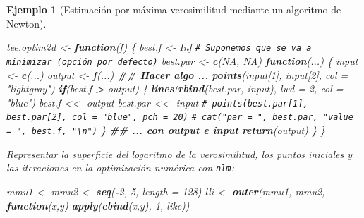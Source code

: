 \documentclass[
  spanish,
  10pt,
]{book}
\newenvironment{Shaded}{\begin{snugshade}}{\end{snugshade}}
\newcommand{\AttributeTok}[1]{\textcolor[rgb]{0.13,0.29,0.53}{#1}}
\newcommand{\CommentTok}[1]{\textcolor[rgb]{0.56,0.35,0.01}{\textit{#1}}}
\newcommand{\ConstantTok}[1]{\textcolor[rgb]{0.56,0.35,0.01}{#1}}
\newcommand{\ControlFlowTok}[1]{\textcolor[rgb]{0.13,0.29,0.53}{\textbf{#1}}}
\newcommand{\DecValTok}[1]{\textcolor[rgb]{0.00,0.00,0.81}{#1}}
\newcommand{\DocumentationTok}[1]{\textcolor[rgb]{0.56,0.35,0.01}{\textbf{\textit{#1}}}}
\newcommand{\FunctionTok}[1]{\textcolor[rgb]{0.13,0.29,0.53}{\textbf{#1}}}
\newcommand{\NormalTok}[1]{#1}
\newcommand{\OtherTok}[1]{\textcolor[rgb]{0.56,0.35,0.01}{#1}}
\newcommand{\SpecialCharTok}[1]{\textcolor[rgb]{0.81,0.36,0.00}{\textbf{#1}}}
\newcommand{\StringTok}[1]{\textcolor[rgb]{0.31,0.60,0.02}{#1}}
\theoremstyle{break}
\newtheorem{example}{Ejemplo}[chapter]
\theoremstyle{nonumberplain}
\renewcommand{\CommentTok}[1]{\textcolor[rgb]{0.41,0.41,0.41}{\texttt{#1}}}
\begin{document}
\begin{example}[Estimación por máxima verosimilitud mediante un algoritmo de Newton]
\begin{Shaded}
\begin{Highlighting}[]
\NormalTok{tee.optim2d }\OtherTok{\textless{}{-}} \ControlFlowTok{function}\NormalTok{(f) \{}
\NormalTok{  best.f }\OtherTok{\textless{}{-}} \ConstantTok{Inf}   \CommentTok{\# Suponemos que se va a minimizar (opción por defecto)}
\NormalTok{  best.par }\OtherTok{\textless{}{-}} \FunctionTok{c}\NormalTok{(}\ConstantTok{NA}\NormalTok{, }\ConstantTok{NA}\NormalTok{)   }
  \ControlFlowTok{function}\NormalTok{(...) \{}
\NormalTok{    input }\OtherTok{\textless{}{-}} \FunctionTok{c}\NormalTok{(...)}
\NormalTok{    output }\OtherTok{\textless{}{-}} \FunctionTok{f}\NormalTok{(...)}
    \DocumentationTok{\#\# Hacer algo ...}
    \FunctionTok{points}\NormalTok{(input[}\DecValTok{1}\NormalTok{], input[}\DecValTok{2}\NormalTok{], }\AttributeTok{col =} \StringTok{"lightgray"}\NormalTok{)}
    \ControlFlowTok{if}\NormalTok{(best.f }\SpecialCharTok{\textgreater{}}\NormalTok{ output) \{}
      \FunctionTok{lines}\NormalTok{(}\FunctionTok{rbind}\NormalTok{(best.par, input), }\AttributeTok{lwd =} \DecValTok{2}\NormalTok{, }\AttributeTok{col =} \StringTok{"blue"}\NormalTok{)}
\NormalTok{      best.f }\OtherTok{\textless{}\textless{}{-}}\NormalTok{ output}
\NormalTok{      best.par }\OtherTok{\textless{}\textless{}{-}}\NormalTok{ input}
      \CommentTok{\# points(best.par[1], best.par[2], col = "blue", pch = 20)}
      \CommentTok{\# cat("par = ", best.par, "value = ", best.f, "\textbackslash{}n")}
\NormalTok{    \} }
    \DocumentationTok{\#\# ... con output e input}
    \FunctionTok{return}\NormalTok{(output)}
\NormalTok{  \}}
\NormalTok{\}}
\end{Highlighting}
\end{Shaded}

Representar la superficie del logaritmo de la verosimilitud,
los puntos iniciales y las iteraciones en la optimización numérica con \texttt{nlm}:

\begin{Shaded}
\begin{Highlighting}[]
\NormalTok{mmu1 }\OtherTok{\textless{}{-}}\NormalTok{ mmu2 }\OtherTok{\textless{}{-}} \FunctionTok{seq}\NormalTok{(}\SpecialCharTok{{-}}\DecValTok{2}\NormalTok{, }\DecValTok{5}\NormalTok{, }\AttributeTok{length =} \DecValTok{128}\NormalTok{)}
\NormalTok{lli }\OtherTok{\textless{}{-}} \FunctionTok{outer}\NormalTok{(mmu1, mmu2, }\ControlFlowTok{function}\NormalTok{(x,y) }\FunctionTok{apply}\NormalTok{(}\FunctionTok{cbind}\NormalTok{(x,y), }\DecValTok{1}\NormalTok{, like))}


\end{Highlighting}
\end{Shaded}
\end{example}
\end{document}
